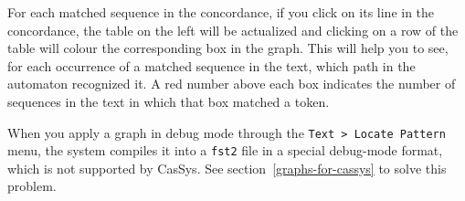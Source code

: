 \bigskip
\noindent For each matched sequence in the concordance, if you click on its line in the concordance, the table on the left will be actualized and clicking on a row of the table will colour the corresponding box in the graph. This will help you to see, for each occurrence of a matched sequence in the text, which path in the automaton recognized it. A red number above each box indicates the number of sequences in the text in which that box matched a token. 

\bigskip
\noindent When you apply a graph in debug mode through the \verb+Text > Locate Pattern+ menu, the system compiles it into a \verb+fst2+ file in a special debug-mode format, which is not supported by CasSys. See section~\ref{graphs-for-cassys} to solve this problem.